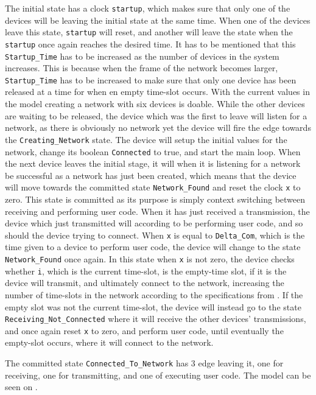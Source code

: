 The initial state has a clock \texttt{startup}, which makes sure that only one of the devices will be leaving the initial state at the same time.
When one of the devices leave this state, \texttt{startup} will reset, and another will leave the state when the \texttt{startup} once again reaches the desired time.
It has to be mentioned that this \texttt{Startup_Time} has to be increased as the number of devices in the system increases.
This is because when the frame of the network becomes larger, \texttt{Startup_Time} has to be increased to make sure that only one device has been released at a time for when en empty time-slot occurs.
With the current values in the model creating a network with six devices is doable.
While the other devices are waiting to be released, the device which was the first to leave will listen for a network, as there is obviously no network yet the device will fire the edge towards the \texttt{Creating\_Network} state.
The device will setup the initial values for the network, change its boolean \texttt{Connected} to true, and start the main loop.
When the next device leaves the initial stage, it will when it is listening for a network be successful as a network has just been created, which means that the device will move towards the committed state \texttt{Network\_Found} and reset the clock \texttt{x} to zero.
This state is committed as its purpose is simply context switching between receiving and performing user code.
When it has just received a transmission, the device which just transmitted will according to  be performing user code, and so should the device trying to connect.
When \texttt{x} is equal to \texttt{Delta\_Com}, which is the time given to a device to perform user code, the device will change to the state \texttt{Network\_Found} once again.
In this state when \texttt{x} is not zero, the device checks whether \texttt{i}, which is the current time-slot, is the empty-time slot, if it is the device will transmit, and ultimately connect to the network, increasing the number of time-slots in the network according to the specifications from .
If the empty slot was not the current time-slot, the device will instead go to the state \texttt{Receiving\_Not\_Connected} where it will receive the other devices' transmissions, and once again reset \texttt{x} to zero, and perform user code, until eventually the empty-slot occurs, where it will connect to the network.

The committed state \texttt{Connected\_To\_Network} has 3 edge leaving it, one for receiving, one for transmitting, and one of executing user code.
The model can be seen on .

